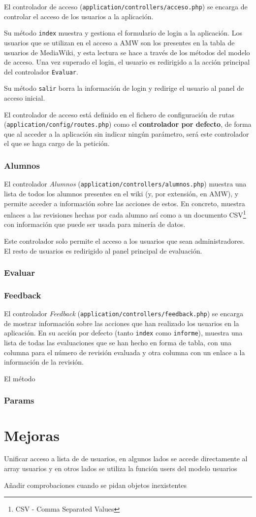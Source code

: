\documentclass[11pt]{article}
\begin{document}
El controlador de acceso (\texttt{application/controllers/acceso.php}) se
encarga de controlar el acceso de los usuarios a la aplicación. 

Su método \texttt{index} muestra y gestiona el formulario de login a la
aplicación. Los usuarios que se utilizan en el acceso a AMW son los presentes en
la tabla de usuarios de MediaWiki, y esta lectura se hace a través de los
métodos del modelo de acceso. Una vez superado el login, el usuario es
redirigido a la acción principal del controlador \texttt{Evaluar}.

Su método \texttt{salir} borra la información de login y redirige el usuario al
panel de acceso inicial.

El controlador de acceso está definido en el fichero de configuración de rutas
(\texttt{application/config/routes.php}) como el \textbf{controlador por
  defecto}, de forma que al acceder a la aplicación sin indicar ningún
parámetro, será este controlador el que se haga cargo de la petición.

\subsubsection{Alumnos}

El controlador \textit{Alumnos} (\texttt{application/controllers/alumnos.php})
muestra una lista de todos los alumnos presentes en el wiki (y, por extensión,
en AMW), y permite acceder a información sobre las acciones de estos. En
concreto, muestra enlaces a las revisiones hechas por cada alumno así como a un
documento CSV\footnote{CSV - Comma Separated Values} con información que puede
ser usada para minería de datos.

Este controlador solo permite el acceso a los usuarios que sean
administradores. El resto de usuarios es redirigido al panel principal de
evaluación.

\subsubsection{Evaluar}

\subsubsection{Feedback}

El controlador \textit{Feedback} (\texttt{application/controllers/feedback.php})
se encarga de mostrar información sobre las acciones que han realizado los
usuarios en la aplicación. En su acción por defecto (tanto \texttt{index} como
\texttt{informe}), muestra una lista de todas las evaluaciones que se han hecho
en forma de tabla, con una columna para el número de revisión evaluada y otra
columna con un enlace a la información de la revisión.

El método 

\subsubsection{Params}

\section{Mejoras}

Unificar acceso a lista de de usuarios, en algunos lados se accede directamente
al array usuarios y en otros lados se utiliza la función users del modelo usuarios

Añadir comprobaciones cuando se pidan objetos inexistentes
\end{document}
